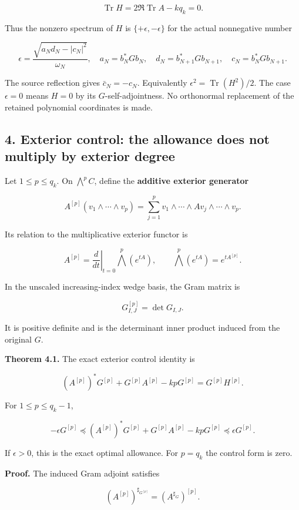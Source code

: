 \[
\operatorname{Tr}H=2\Re\operatorname{Tr}A-kq_k=0.
\]

Thus the nonzero spectrum of \(H\) is \(\{+\epsilon,-\epsilon\}\) for
the actual nonnegative number

\[
\boxed{
\epsilon=
\frac{\sqrt{a_Nd_N-|c_N|^2}}{\omega_N},\quad
 a_N=b_N^*Gb_N,\quad d_N=b_{N+1}^*Gb_{N+1},\quad
 c_N=b_N^*Gb_{N+1}.
}
\]

The source reflection gives \(\bar c_N=-c_N\). Equivalently
\(\epsilon^2=\operatorname{Tr}(H^2)/2\). The case \(\epsilon=0\) means
\(H=0\) by its \(G\)-self-adjointness. No orthonormal replacement of the
retained polynomial coordinates is made.

\subsection{4. Exterior control: the allowance does not multiply by
exterior
degree}\label{exterior_trace:exterior-control-the-allowance-does-not-multiply-by-exterior-degree}

Let \(1\leq p\leq q_k\). On \(\bigwedge^p C\), define the
\textbf{additive exterior generator}

\[
A^{[p]}(v_1\wedge\cdots\wedge v_p)
=\sum_{j=1}^p
v_1\wedge\cdots\wedge Av_j\wedge\cdots\wedge v_p.
\]

Its relation to the multiplicative exterior functor is

\[
A^{[p]}=\left.\frac{d}{dt}\right|_{t=0}\bigwedge^p(e^{tA}),
\qquad
\bigwedge^p(e^{tA})=e^{tA^{[p]}}.
\]

In the unscaled increasing-index wedge basis, the Gram matrix is

\[
G^{[p]}_{I,J}=\det G_{I,J}.
\]

It is positive definite and is the determinant inner product induced
from the original \(G\).

\textbf{Theorem 4.1.} The exact exterior control identity is

\[
\boxed{
(A^{[p]})^*G^{[p]}+G^{[p]}A^{[p]}-kpG^{[p]}
=G^{[p]}H^{[p]}.
}
\]

For \(1\leq p\leq q_k-1\),

\[
\boxed{
-\epsilon G^{[p]}
\preceq
(A^{[p]})^*G^{[p]}+G^{[p]}A^{[p]}-kpG^{[p]}
\preceq\epsilon G^{[p]}.
}
\]

If \(\epsilon>0\), this is the exact optimal allowance. For \(p=q_k\)
the control form is zero.

\textbf{Proof.} The induced Gram adjoint satisfies

\[
(A^{[p]})^{\sharp_{G^{[p]}}}=(A^{\sharp_G})^{[p]}.
\]

